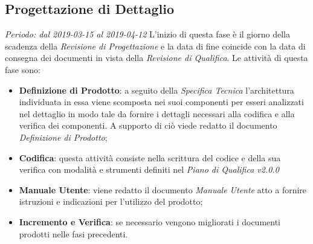 \subsection{Progettazione di Dettaglio}
\textit{Periodo: dal 2019-03-15 al 2019-04-12}
L'inizio di questa fase è il giorno della scadenza della \textit{Revisione di 
Progettazione} e la data di fine coincide con la data di consegna dei documenti 
in vista della \textit{Revisione di Qualifica}. Le attività di questa fase sono:
\begin{itemize}
	\item \textbf{Definizione di Prodotto}: a seguito della \textit{Specifica 
	Tecnica} l'architettura individuata in essa viene scomposta nei suoi 
	componenti per esseri analizzati nel dettaglio in modo tale da fornire i 
	dettagli necessari alla codifica e alla verifica dei componenti. A supporto 
	di ciò viede redatto il documento \textit{Definizione di Prodotto};
	\item \textbf{Codifica}: questa attività consiste nella scrittura del 
	codice e della sua verifica con modalità e strumenti definiti nel 
	\textit{Piano di Qualifica v2.0.0}
	\item \textbf{Manuale Utente}: viene redatto il documento \textit{Manuale 
	Utente} atto a fornire istruzioni e indicazioni per l'utilizzo del prodotto;
	\item \textbf{Incremento e Verifica}: se necessario vengono migliorati i 
	documenti prodotti nelle fasi precedenti.
\end{itemize}


